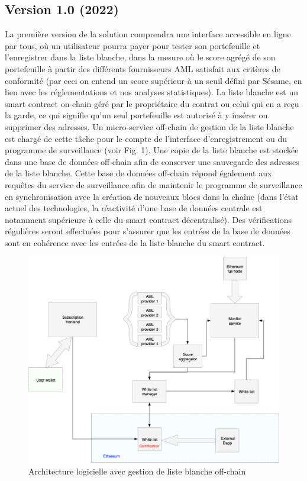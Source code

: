 ﻿\documentclass[a4paper]{article}
\begin{document}
\subsection{Version 1.0 (2022)}
La première version de la solution comprendra une interface accessible en ligne par tous, où un utilisateur pourra payer pour tester son portefeuille et l’enregistrer dans la liste blanche, dans la mesure où le score agrégé de son portefeuille à partir des différents fournisseurs AML satisfait aux critères de conformité (par ceci on entend un score supérieur à un seuil défini par Sésame, en lien avec les réglementations et nos analyses statistiques).
La liste blanche est un smart contract on-chain géré par le propriétaire du contrat ou celui qui en a reçu la garde, ce qui signifie qu'un seul portefeuille est autorisé à y insérer ou supprimer des adresses. Un micro-service off-chain de gestion de la liste blanche est chargé de cette tâche pour le compte de l'interface d'enregistrement ou du programme de surveillance (voir Fig. 1).
Une copie de la liste blanche est stockée dans une base de données off-chain afin de conserver une sauvegarde des adresses de la liste blanche. Cette base de données off-chain répond également aux requêtes du service de surveillance afin de maintenir le programme de surveillance en synchronisation avec la création de nouveaux blocs dans la chaîne (dans l’état actuel des technologies, la réactivité d'une base de données centrale est notamment supérieure à celle du smart contract décentralisé). Des vérifications régulières seront effectuées pour s'assurer que les entrées de la base de données sont en cohérence avec les entrées de la liste blanche du smart contract. \\

\begin{figure}[!h]
\centering
\includegraphics[scale=0.35]{architecture_v1_trim.png}
\caption{Architecture logicielle avec gestion de liste blanche off-chain}
\label{offchain}
\end{figure}
\end{document}
